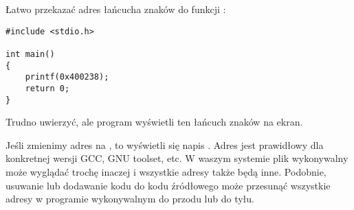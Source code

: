 Łatwo przekazać adres łańcucha znaków  do funkcji :

\begin{lstlisting}[style=customc]
#include <stdio.h>

int main()
{
    printf(0x400238);
    return 0;
}
\end{lstlisting}

Trudno uwierzyć, ale program wyświetli ten łańcuch znaków na ekran.

Jeśli zmienimy adres na , to wyświetli się napis .
Adres jest prawidłowy dla konkretnej wersji GCC, GNU toolset, etc.
W waszym systemie plik wykonywalny może wyglądać trochę inaczej i wszystkie adresy także będą inne.
Podobnie, usuwanie lub dodawanie kodu do kodu źródłowego może przesunąć wszystkie adresy w programie wykonywalnym do przodu lub do tyłu.


